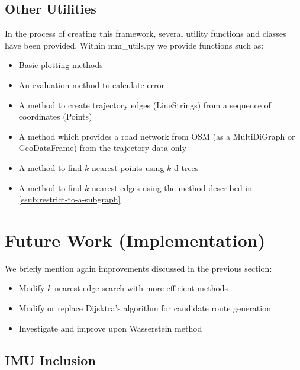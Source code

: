 \documentclass{article}
\numberwithin{equation}{section}
\theoremstyle{definition}
\begin{document}
\subsection{Other Utilities}

In the process of creating this framework, several utility functions and classes have been provided. Within mm\_utils.py we provide functions such as:
\begin{itemize}
    \item Basic plotting methods
    \item An evaluation method to calculate error
    \item A method to create trajectory edges (LineStrings) from a sequence of coordinates (Points)
    \item A method which provides a road network from OSM (as a MultiDiGraph or GeoDataFrame) from the trajectory data only
    \item A method to find $k$ nearest points using $k$-d trees
    \item A method to find $k$ nearest edges using the method described in \ref{ssub:restrict-to-a-subgraph}
\end{itemize}


\section{Future Work (Implementation)}

We briefly mention again improvements discussed in the previous section:
\begin{itemize}
    \item Modify $k$-nearest edge search with more efficient methods
    \item Modify or replace Dijsktra's algorithm for candidate route generation
    \item Investigate and improve upon Wasserstein method
\end{itemize}

\subsection{IMU Inclusion}
\end{document}
